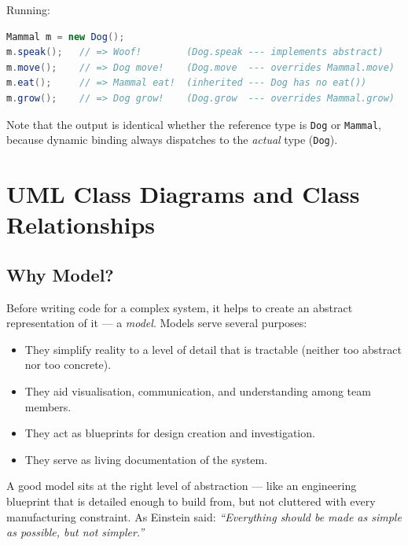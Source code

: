 \documentclass[11pt, a4paper, notitlepage]{report}
\theoremstyle{definition}
\theoremstyle{remark}
\theoremstyle{definition}
\begin{document}
Running:
\begin{lstlisting}[language=Java]
Mammal m = new Dog();
m.speak();   // => Woof!        (Dog.speak --- implements abstract)
m.move();    // => Dog move!    (Dog.move  --- overrides Mammal.move)
m.eat();     // => Mammal eat!  (inherited --- Dog has no eat())
m.grow();    // => Dog grow!    (Dog.grow  --- overrides Mammal.grow)
\end{lstlisting}

Note that the output is identical whether the reference type is \texttt{Dog} or \texttt{Mammal}, because dynamic binding always dispatches to the \emph{actual} type (\texttt{Dog}).

\chapter{UML Class Diagrams and Class Relationships}
\label{chap:uml-class-diagram}

\section{Why Model?}
\label{sec:ch6-why-model}

Before writing code for a complex system, it helps to create an abstract
representation of it --- a \emph{model}.  Models serve several purposes:

\begin{itemize}[noitemsep]
  \item They simplify reality to a level of detail that is tractable
        (neither too abstract nor too concrete).
  \item They aid visualisation, communication, and understanding among team
        members.
  \item They act as blueprints for design creation and investigation.
  \item They serve as living documentation of the system.
\end{itemize}

A good model sits at the right level of abstraction --- like an engineering
blueprint that is detailed enough to build from, but not cluttered with
every manufacturing constraint.  As Einstein said: \textit{``Everything
should be made as simple as possible, but not simpler.''}

\end{document}
